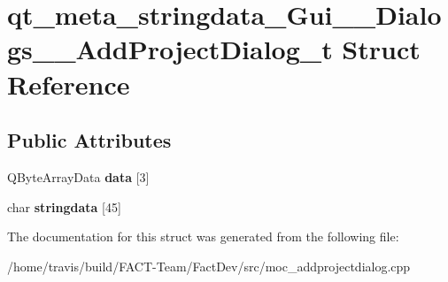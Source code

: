 \hypertarget{structqt__meta__stringdata__Gui____Dialogs____AddProjectDialog__t}{\section{qt\-\_\-meta\-\_\-stringdata\-\_\-\-Gui\-\_\-\-\_\-\-Dialogs\-\_\-\-\_\-\-Add\-Project\-Dialog\-\_\-t Struct Reference}
\label{structqt__meta__stringdata__Gui____Dialogs____AddProjectDialog__t}
}
\subsection*{Public Attributes}
\begin{DoxyCompactItemize}
\item 
\hypertarget{structqt__meta__stringdata__Gui____Dialogs____AddProjectDialog__t_a1e4f6157c0cb6ab9fb1b2beae2f28e54}{Q\-Byte\-Array\-Data {\bfseries data} \mbox{[}3\mbox{]}}\label{structqt__meta__stringdata__Gui____Dialogs____AddProjectDialog__t_a1e4f6157c0cb6ab9fb1b2beae2f28e54}

\item 
\hypertarget{structqt__meta__stringdata__Gui____Dialogs____AddProjectDialog__t_a89ee119f731f2754b3ea971cbe05bc31}{char {\bfseries stringdata} \mbox{[}45\mbox{]}}\label{structqt__meta__stringdata__Gui____Dialogs____AddProjectDialog__t_a89ee119f731f2754b3ea971cbe05bc31}

\end{DoxyCompactItemize}


The documentation for this struct was generated from the following file\-:\begin{DoxyCompactItemize}
\item 
/home/travis/build/\-F\-A\-C\-T-\/\-Team/\-Fact\-Dev/src/moc\-\_\-addprojectdialog.\-cpp\end{DoxyCompactItemize}
